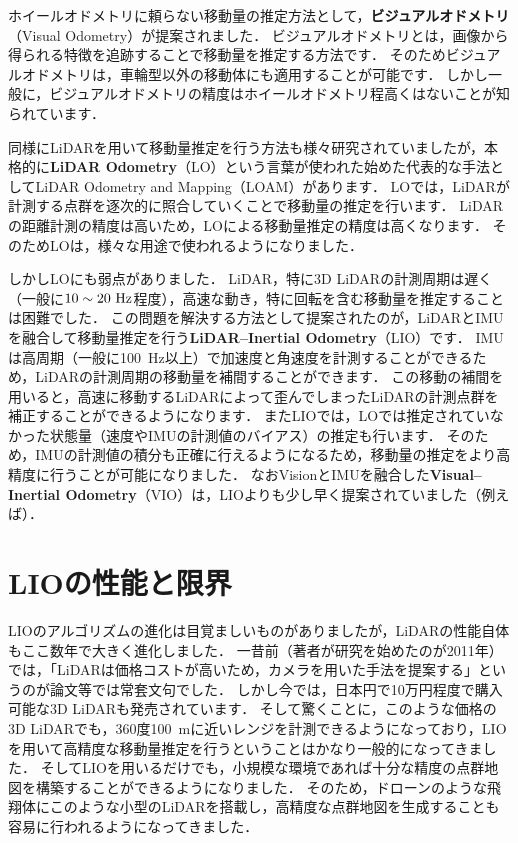 ホイールオドメトリに頼らない移動量の推定方法として，{\bf ビジュアルオドメトリ}（Visual Odometry）が提案されました\cite{VisuailOdometry}．
ビジュアルオドメトリとは，画像から得られる特徴を追跡することで移動量を推定する方法です．
そのためビジュアルオドメトリは，車輪型以外の移動体にも適用することが可能です．
しかし一般に，ビジュアルオドメトリの精度はホイールオドメトリ程高くはないことが知られています．

同様にLiDARを用いて移動量推定を行う方法も様々研究されていましたが，本格的に{\bf LiDAR Odometry}（LO）という言葉が使われた始めた代表的な手法としてLiDAR Odometry and Mapping（LOAM）があります\cite{LOAM}．
LOでは，LiDARが計測する点群を逐次的に照合していくことで移動量の推定を行います．
LiDARの距離計測の精度は高いため，LOによる移動量推定の精度は高くなります．
そのためLOは，様々な用途で使われるようになりました．

しかしLOにも弱点がありました．
LiDAR，特に3D LiDARの計測周期は遅く（一般に$10 \sim 20~{\rm Hz}$程度），高速な動き，特に回転を含む移動量を推定することは困難でした．
この問題を解決する方法として提案されたのが，LiDARとIMUを融合して移動量推定を行う{\bf LiDAR--Inertial Odometry}（LIO）です．
IMUは高周期（一般に100~Hz以上）で加速度と角速度を計測することができるため，LiDARの計測周期の移動量を補間することができます．
この移動の補間を用いると，高速に移動するLiDARによって歪んでしまったLiDARの計測点群を補正することができるようになります．
またLIOでは，LOでは推定されていなかった状態量（速度やIMUの計測値のバイアス）の推定も行います．
そのため，IMUの計測値の積分も正確に行えるようになるため，移動量の推定をより高精度に行うことが可能になりました．
なおVisionとIMUを融合した{\bf Visual--Inertial Odometry}（VIO）は，LIOよりも少し早く提案されていました（例えば\cite{VIO}）．









\section{LIOの性能と限界}

LIOのアルゴリズムの進化は目覚ましいものがありましたが，LiDARの性能自体もここ数年で大きく進化しました．
一昔前（著者が研究を始めたのが2011年）では，「LiDARは価格コストが高いため，カメラを用いた手法を提案する」というのが論文等では常套文句でした．
しかし今では，日本円で10万円程度で購入可能な3D LiDARも発売されています．
そして驚くことに，このような価格の3D LiDARでも，360度100~mに近いレンジを計測できるようになっており，LIOを用いて高精度な移動量推定を行うということはかなり一般的になってきました．
そしてLIOを用いるだけでも，小規模な環境であれば十分な精度の点群地図を構築することができるようになりました．
そのため，ドローンのような飛翔体にこのような小型のLiDARを搭載し，高精度な点群地図を生成することも容易に行われるようになってきました．


